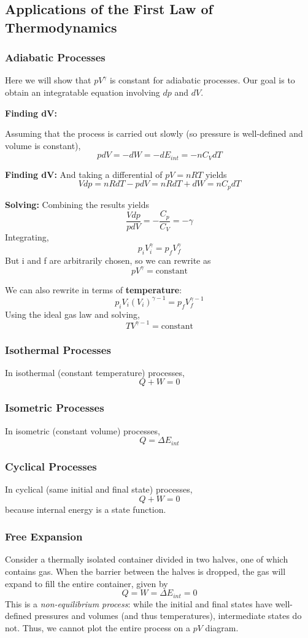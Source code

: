\documentclass[../PhysicsFormulae.tex]{subfiles}
\begin{document}
\subsection{Applications of the First Law of Thermodynamics}
\subsubsection{Adiabatic Processes}
Here we will show that $pV^{\gamma}$ is constant for adiabatic processes. Our goal is to obtain an integratable equation involving $dp$ and $dV$. \bigskip 

\textbf{Finding dV:}

Assuming that the process is carried out slowly (so pressure is well-defined and volume is constant), 
\[ pdV = -dW = -dE_{int} = -nC_V dT \]

\textbf{Finding dV:}
And taking a differential of $pV = nRT$ yields 
\[ Vdp = nRdT - pdV = nRdT + dW = nC_p dT \]

\textbf{Solving:}
Combining the results yields 
\[ \frac{Vdp}{pdV} = -\frac{C_p}{C_V} = -\gamma \]
Integrating, 
\[ p_i V_i^{\gamma} = p_f V_f^{\gamma} \]
But i and f are arbitrarily chosen, so we can rewrite as 
\[ pV^{\gamma} = \mathrm{constant} \]
\bigskip 

We can also rewrite in terms of \textbf{temperature}:
\[ p_i V_i (V_i)^{\gamma - 1} = p_f V_f^{\gamma - 1} \]
Using the ideal gas law and solving, 
\[ T V^{\gamma - 1} = \mathrm{constant} \]

\subsubsection{Isothermal Processes}
In isothermal (constant temperature) processes, 
\[ Q + W = 0 \]

\subsubsection{Isometric Processes}
In isometric (constant volume) processes, 
\[ Q = \Delta E_{int} \]

\subsubsection{Cyclical Processes}
In cyclical (same initial and final state) processes, 
\[ Q + W = 0 \]
because internal energy is a state function. 

\subsubsection{Free Expansion}
Consider a thermally isolated container divided in two halves, one of which contains gas. When the barrier between the halves is dropped, the gas will expand to fill the entire container, given by 
\[ Q = W = \Delta E_{int} = 0 \]
This is a \textit{non-equilibrium process}: while the initial and final states have well-defined pressures and volumes (and thus temperatures), intermediate states do not. Thus, we cannot plot the entire process on a $pV$ diagram. 
\end{document}
